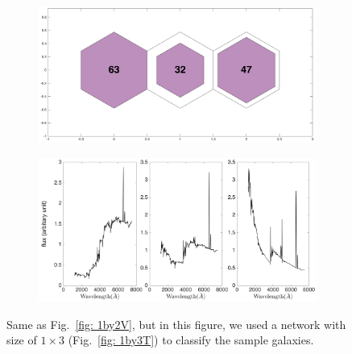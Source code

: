             \begin{figure}
                \begin{subfigure}[b]{0.5\textwidth}
                    \centering
                    \includegraphics[width=\textwidth]{images0.01/1d/hit_v_1_by_3.png}
                \end{subfigure}
                \hfill
                \begin{subfigure}[b]{0.5\textwidth}
                     \includegraphics[width=\textwidth]{images0.01/1d/SED_total1by3.png}
                \end{subfigure}
                \caption{Same as Fig.~\ref{fig: 1by2V}, but in this figure, we used a network with size of $1\times3$ (Fig.~\ref{fig: 1by3T}) to classify the sample galaxies.}
                \label{fig: 1by3V}
            \end{figure}       
            
